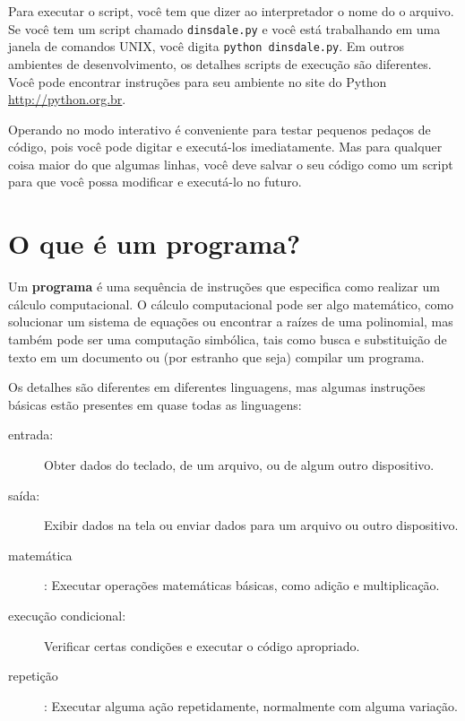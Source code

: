 \documentclass[10pt]{book}
\begin{document}
Para executar o script, você tem que dizer ao interpretador o nome do
o arquivo. Se você tem um script chamado {\tt dinsdale.py} e você está
trabalhando em uma janela de comandos UNIX, você digita {\tt python
dinsdale.py}. Em outros ambientes de desenvolvimento, os detalhes
scripts de execução são diferentes. Você pode encontrar instruções para
seu ambiente no site do Python \url{http://python.org.br}.

Operando no modo interativo é conveniente para testar pequenos pedaços de
código, pois você pode digitar e executá-los imediatamente. Mas para
qualquer coisa maior do que algumas linhas, você deve salvar o seu código
como um script para que você possa modificar e executá-lo no futuro.


\section{O que é um programa?}

Um {\bf programa} é uma sequência de instruções que especifica como
realizar um cálculo computacional. O cálculo computacional pode ser algo
matemático, como solucionar um sistema de equações ou encontrar a
raízes de uma polinomial, mas também pode ser uma computação simbólica, tais
como busca e substituição de texto em um documento ou (por estranho que seja)
compilar um programa.

Os detalhes são diferentes em diferentes linguagens, mas algumas instruções
básicas estão presentes em quase todas as linguagens:

\begin{description}

\item[entrada:] Obter dados do teclado, de um arquivo, ou de algum
outro dispositivo.

\item[saída:] Exibir dados na tela ou enviar dados para um
arquivo ou outro dispositivo.

\item[matemática]: Executar operações matemáticas básicas, como adição e
multiplicação.

\item[execução condicional:] Verificar certas condições e
executar o código apropriado.

\item[repetição]: Executar alguma ação repetidamente, normalmente com
alguma variação.

\end{description}
\end{document}
